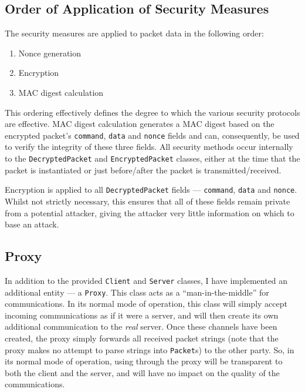 \documentclass[a4paper,11pt]{article}
\begin{document}
\subsection{Order of Application of Security Measures}
The security measures are applied to packet data in the following order:
\begin{enumerate}
\item Nonce generation
\item Encryption
\item MAC digest calculation
\end{enumerate}

This ordering effectively defines the degree to which the various security
protocols are effective. MAC digest calculation generates a MAC digest based on
the encrypted packet's \verb+command+, \verb+data+ and \verb+nonce+ fields and
can, consequently, be used to verify the integrity of these three fields. All
security methods occur internally to the \verb+DecryptedPacket+ and
\verb+EncryptedPacket+ classes, either at the time that the packet is
instantiated or just before/after the packet is transmitted/received.

Encryption is applied to all \verb+DecryptedPacket+ fields --- \verb+command+,
\verb+data+ and \verb+nonce+. Whilst not strictly necessary, this ensures that
all of these fields remain private from a potential attacker, giving the
attacker very little information on which to base an attack.

\subsection{Proxy}
In addition to the provided \serviceName{} \verb+Client+ and \verb+Server+
classes, I have implemented an additional \serviceName{} entity --- a
\serviceName{} \verb+Proxy+. This class acts as a ``man-in-the-middle'' for
\serviceName{} communications. In its normal mode of operation, this class will
simply accept incoming \serviceName{} communications as if it were a
\serviceName{} server, and will then create its own additional \serviceName{}
communication to the \emph{real} \serviceName{} server. Once these channels have
been created, the proxy simply forwards all received packet strings (note that
the proxy makes no attempt to parse strings into \verb+Packet+s) to the other
party. So, in its normal mode of operation, using \serviceName{} through the
proxy will be transparent to both the client and the server, and will have no
impact on the quality of the communications.
\end{document}
